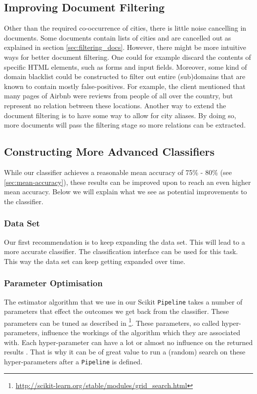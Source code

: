 \subsection{Improving Document Filtering}
Other than the required co-occurrence of cities, there is little noise cancelling in documents. Some documents contain lists of cities and are cancelled out as explained in section \ref{sec:filtering_docs}. However, there might be more intuitive ways for better document filtering. One could for example discard the contents of specific HTML elements, such as forms and input fields. Moreover, some kind of domain blacklist could be constructed to filter out entire (sub)domains that are known to contain mostly false-positives. For example, the client mentioned that many pages of Airbnb were reviews from people of all over the country, but represent no relation between these locations. Another way to extend the document filtering is to have some way to allow for city aliases. By doing so, more documents will pass the filtering stage so more relations can be extracted.

\subsection{Constructing More Advanced Classifiers}
While our classifier achieves a reasonable mean accuracy of 75\% - 80\% (see \ref{sec:mean-accuracy}), these results can be improved upon to reach an even higher mean accuracy. Below we will explain what we see as potential improvements to the classifier.

\subsubsection{Data Set}
Our first recommendation is to keep expanding the data set. This will lead to a more accurate classifier. The classification interface can be used for this task. This way the data set can keep getting expanded over time.
\subsubsection{Parameter Optimisation}
The estimator algorithm that we use in our Scikit \texttt{Pipeline} takes a number of parameters that effect the outcomes we get back from the classifier. These parameters can be tuned as described in \footnote{\url{http://scikit-learn.org/stable/modules/grid_search.html}}. These parameters, so called hyper-parameters, influence the workings of the algorithm which they are associated with. Each hyper-parameter can have a lot or almost no influence on the returned results \cite{bergstra2012random}. That is why it can be of great value to run a (random) search on these hyper-parameters after a \texttt{Pipeline} is defined.
